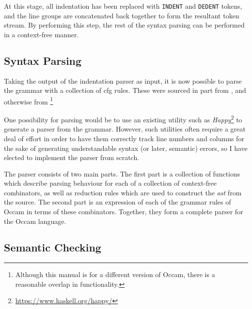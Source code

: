 At this stage, all indentation has been replaced with \texttt{INDENT} and
\texttt{DEDENT} tokens, and the line groups are concatenated back together to
form the resultant token stream. By performing this step, the rest of the syntax
parsing can be performed in a context-free manner.

\subsection{Syntax Parsing}

Taking the output of the indentation parser as input, it is now possible to
parse the grammar with a collection of \gls{cfg} rules. These were sourced in
part from \cite[p.~124]{jones}, and otherwise from
\cite[p.~106]{occ21}\footnote{Although this manual is for a different version of
Occam, there is a reasonable overlap in functionality.}

One possibility for parsing would be to use an existing utility such as
\textit{Happy}\footnote{\url{https://www.haskell.org/happy/}} to generate a
parser from the grammar. However, such utilities often require a great deal of
effort in order to have them correctly track line numbers and columns for the
sake of generating understandable syntax (or later, semantic) errors, so I have
elected to implement the parser from scratch.

The parser consists of two main parts. The first part is a collection of
functions which describe parsing behaviour for each of a collection of
context-free combinators, as well as reduction rules which are used to construct
the \textit{\gls{ast}} from the source. The second part is an expression of each
of the grammar rules of Occam in terms of these combinators. Together, they form
a complete parser for the Occam language.

\subsection{Semantic Checking}

